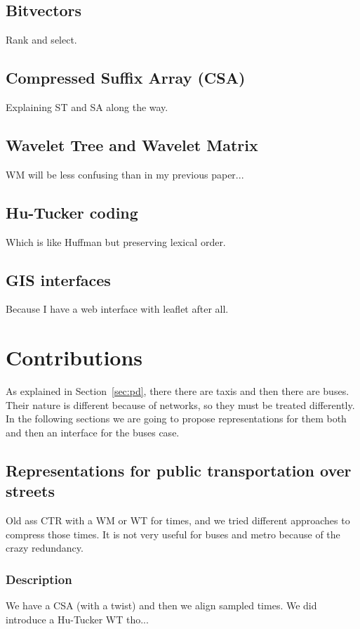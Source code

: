 \documentclass{UniVieCS_PhD} %
\begin{document}
	\subsection{Bitvectors}
	Rank and select.
	
	\subsection{Compressed Suffix Array (CSA)}
	Explaining ST and SA along the way.
	
	\subsection{Wavelet Tree and Wavelet Matrix}
	WM will be less confusing than in my previous paper...
	
	\subsection{Hu-Tucker coding}
	Which is like Huffman but preserving lexical order.
	
	\subsection{GIS interfaces}
	Because I have a web interface with leaflet after all.
	
	
	\section{Contributions}
	As explained in Section~\ref{sec:pd}, there there are taxis and then there are buses. Their nature is different because of networks, so they must be treated differently. In the following sections we are going to propose representations for them both and then an interface for the buses case.
	
	\subsection{Representations for public transportation over streets}
	Old ass CTR \cite{brisaboa2018compact} with a WM or WT for times, and we tried different approaches to compress those times. It is not very useful for buses and metro because of the crazy redundancy.
	
	\subsubsection{Description}
	We have a CSA (with a twist) and then we align sampled times. We did introduce a Hu-Tucker WT tho...
	
\end{document}
